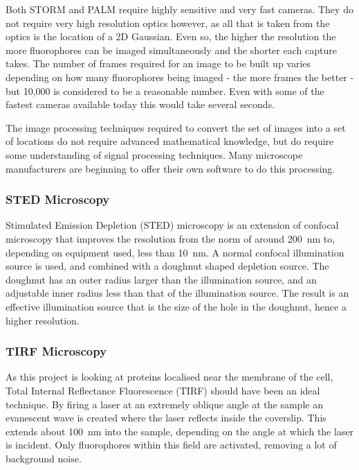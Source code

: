 \documentclass[../main.tex]{subfiles}
\begin{document}
Both STORM and PALM require highly sensitive and very fast cameras. They do not require very high resolution optics however, as all that is taken from the optics is the location of a 2D Gaussian. Even so, the higher the resolution the more fluorophores can be imaged simultaneously and the shorter each capture takes. The number of frames required for an image to be built up varies depending on how many fluorophores being imaged - the more frames the better - but 10,000 is considered to be a reasonable number. Even with some of the fastest cameras available today this would take several seconds.

The image processing techniques required to convert the set of images into a set of locations do not require advanced mathematical knowledge, but do require some understanding of signal processing techniques. Many microscope manufacturers are beginning to offer their own software to do this processing.

\subsubsection{STED Microscopy}

Stimulated Emission Depletion (STED) microscopy is an extension of confocal microscopy that improves the resolution from the norm of around \SI{200}{\nano\meter} to, depending on equipment used, less than \SI{10}{\nano\meter}\citep{rittweger09}. A normal confocal illumination source is used, and combined with a doughnut shaped depletion source. The doughnut has an outer radius larger than the illumination source, and an adjustable inner radius less than that of the illumination source. The result is an effective illumination source that is the size of the hole in the doughnut, hence a higher resolution.

\subsubsection{TIRF Microscopy}
As this project is looking at proteins localised near the membrane of the cell, Total Internal Reflectance Fluorescence (TIRF) should have been an ideal technique. By firing a laser at an extremely oblique angle at the sample an evanescent wave is created where the laser reflects inside the coverslip. This extends about \SI{100}{\nano\meter} into the sample, depending on the angle at which the laser is incident. Only fluorophores within this field are activated, removing a lot of background noise.
\end{document}
